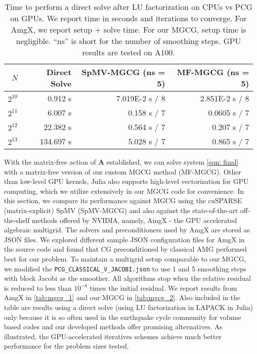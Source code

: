 \begin{table*}
    \caption{Time to perform a direct solve after LU factorization on CPUs vs PCG on GPUs. We report time in seconds and iterations to converge. For AmgX, we report setup + solve time. For our MGCG, setup time is negligible. ``$\mathrm{ns}$'' is short for the number of smoothing steps. GPU results are tested on A100.}
    \small
    \centering
    \begin{tabular}{rrrr}
    \toprule
    $N$     & Direct Solve  & SpMV-MGCG (ns = 5)   & MF-MGCG (ns = 5)\\
    \midrule
    $2^{10}$  &   0.912 s & 7.019E-2 s / 8   & 2.851E-2 s / 8       \\
    $2^{11}$ & 6.007 s &  0.158 s / 7  & 0.0605 s / 7     \\
    $2^{12}$ & 22.382 s  & 0.564 s / 7  & 0.207 s / 7         \\
    $2^{13}$ & 134.697 s  & 5.028 s / 7   & 0.865 s / 7      \\
    \bottomrule
    \end{tabular}
    \label{tab:mgcg_2} 
\end{table*}

With the matrix-free action of $\boldsymbol{A}$ established, we can solve system \autoref{eqn: final} with a matrix-free version of our custom MGCG method (MF-MGCG). 
Other than low-level GPU kernels, Julia also supports high-level vectorization for GPU computing, which we utilize extensively in our MGCG code for convenience.
In this section, we compare its performance against MGCG using the cuSPARSE (matrix-explicit) SpMV (SpMV-MGCG) and also against the state-of-the-art off-the-shelf methods offered by NVIDIA, namely, AmgX - the GPU accelerated algebraic multigrid. The solvers and preconditioners used by AmgX are stored as JSON files. 
We explored different sample JSON configuration files for AmgX in the source code and found that CG preconditioned by classical AMG performed best for our problem. 
To maintain a multigrid setup comparable to our MGCG, we modified the \texttt{PCG\_CLASSICAL\_V\_JACOBI.json} to use 1 and 5 smoothing steps with block Jacobi as the smoother.
All algorithms stop when the relative residual is reduced to less than $10^{-6}$ times the initial residual.
We report results from AmgX in \autoref{tab:mgcg_1} and our MGCG in \autoref{tab:mgcg_2}. Also included in the table are results using a direct solve (using LU factorization in LAPACK in Julia) only because it is so often used in the earthquake cycle community for volume based codes \cite{erickson2020community} and our developed methods offer promising alternatives. As illustrated, the GPU-accelerated iteratives schemes achieve much better performance for the problem sizes tested.


